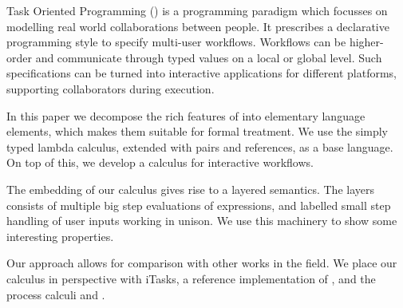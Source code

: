 
Task Oriented Programming (\TOP) is a programming paradigm which focusses on modelling real world collaborations between people.
It prescribes a declarative programming style to specify multi-user workflows.
Workflows can be higher-order and communicate through typed values on a local or global level.
Such specifications can be turned into interactive applications for different platforms,
supporting collaborators during execution.

In this paper we decompose the rich features of \TOP into elementary language elements,
which makes them suitable for formal treatment.
We use the simply typed lambda calculus, extended with pairs and references, as a base language.
On top of this, we develop a calculus for interactive workflows.

The embedding of our calculus gives rise to a layered semantics.
The layers consists of multiple big step evaluations of expressions,
and labelled small step handling of user inputs working in unison.
We use this machinery to show some interesting properties.

Our approach allows for comparison with other works in the field.
We place our calculus in perspective with iTasks, a reference implementation of \TOP,
and the process calculi \CSP and \CCS.
